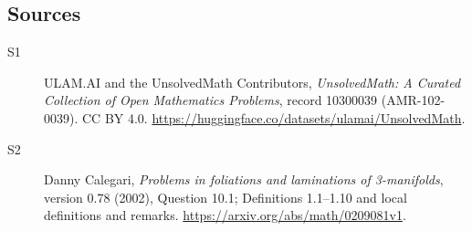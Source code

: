 \documentclass[11pt]{article}
\begin{document}
\subsection{Sources}
\begin{description}
\item[\hypertarget{source:10300039:1}{S1}] ULAM.AI and the UnsolvedMath Contributors, \emph{UnsolvedMath: A Curated Collection of Open Mathematics Problems}, record 10300039 (AMR-102-0039). CC BY 4.0. \url{https://huggingface.co/datasets/ulamai/UnsolvedMath}.
\item[\hypertarget{source:10300039:2}{S2}] Danny Calegari, \emph{Problems in foliations and laminations of 3-manifolds}, version 0.78 (2002), Question 10.1; Definitions 1.1--1.10 and local definitions and remarks. \url{https://arxiv.org/abs/math/0209081v1}.
\end{description}
\label{end:10300039}
\end{document}
